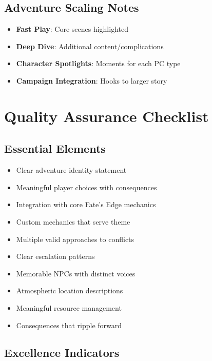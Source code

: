 \documentclass[11pt]{article}
\begin{document}
\subsection*{Adventure Scaling Notes}

\begin{itemize}
  \item \textbf{Fast Play}: Core scenes highlighted
  \item \textbf{Deep Dive}: Additional content/complications
  \item \textbf{Character Spotlights}: Moments for each PC type
  \item \textbf{Campaign Integration}: Hooks to larger story
\end{itemize}

\section*{Quality Assurance Checklist}

\subsection*{Essential Elements}

\begin{itemize}
  \item[$\square$] Clear adventure identity statement
  \item[$\square$] Meaningful player choices with consequences
  \item[$\square$] Integration with core Fate's Edge mechanics
  \item[$\square$] Custom mechanics that serve theme
  \item[$\square$] Multiple valid approaches to conflicts
  \item[$\square$] Clear escalation patterns
  \item[$\square$] Memorable NPCs with distinct voices
  \item[$\square$] Atmospheric location descriptions
  \item[$\square$] Meaningful resource management
  \item[$\square$] Consequences that ripple forward
\end{itemize}

\subsection*{Excellence Indicators}
\end{document}
